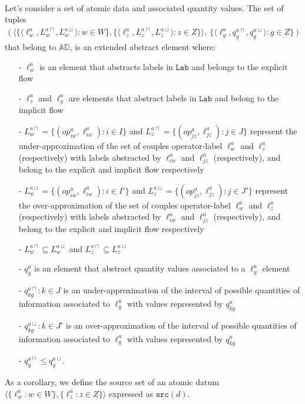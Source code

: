 \documentclass{llncs}
\newcommand{\blangle}{\big\langle}
\newcommand{\brangle}{\big\rangle}
\begin{document}
\begin{definition}\label{ad_abs_ext}
~\\ Let's consider a set of atomic data and associated quantity values. The set of tuples
\begin{align*}
\big (\ \blangle\{\langle \ell^a_w, L_w^{a\sqcap}, L_w^{a\sqcup}\rangle : w \in W\}, \{\langle \ell^a_z, L_z^{a\sqcap}, L_z^{a\sqcup}\rangle : z \in Z\}\brangle,\ \{\langle \ell_g^a, q_g^{a\sqcap}, q_g^{a\sqcup} \rangle: g\in Z \}\ \big )
\end{align*}
that belong to $\mathds{AD}$, is an extended abstract element where:
\begin{itemize}
\item[-] $\ell_w^a$ is an element that abstracts labels in $\texttt{Lab}$ and belongs to the explicit flow
\item[-] $\ell_z^a$ and $\ell_g^a$ are elements that abstract labels in $\texttt{Lab}$ and belong to the implicit flow
\item[-] $L_w^{a\sqcap}= \{(op^a_{iw}, \ell^a_{iw}): i \in I\}$ and $L_z^{a\sqcap}= \{(op^a_{jz}, \ell^a_{jz}): j \in J\}$ represent the under-approximation of the set of couples operator-label  $\ell_w^a $ and $\ell_z^a $ (respectively) with labels abstracted by $\ell_{iw}^a$ and $\ell_{jz}^a$ (respectively), and belong to the explicit and implicit flow respectively
\item[-] $L_w^{a\sqcup}= \{(op^a_{iw}, \ell^a_{iw}): i \in I'\}$ and  $L_z^{a\sqcup}= \{(op^a_{jz}, \ell^a_{jz}): j \in J'\}$ represent the over-approximation of the set of couples operator-label  $\ell_w^a $ and $\ell_z^a $ (respectively) with labels abstracted by $\ell_{iw}^a$ and $\ell_{jz}^a$ (respectively), and belong to the explicit and implicit flow respectively
\item[-] $L_w^{a\sqcap}\subseteq L_w^{a\sqcup}$ and $L_z^{a\sqcap}\subseteq L_z^{a\sqcup}$
\item[-] $q_g^a$ is an element that abstract quantity values associated to a $\ell_g^a$ element
\item[-] $q^{a\sqcap}_{kg}: k \in J$  is an under-approximation of the interval of possible quantities of information associated to $\ell_g^a $ with values represented by $q_{kg}^a$ 
\item[-] $q^{a\sqcup}_{kg}: k \in J'$ is an over-approximation of the interval of possible quantities of information associated to $\ell_g^a $ with values represented by $q_{kg}^a$ 
\item[-] $q_g^{a\sqcap} \leqslant q_g^{a\sqcup}$.
\end{itemize}
\end{definition}
As a corollary, we define the source set of an atomic datum $\langle \{\ell^a_w: w\in W\}, \{\ell^a_z: z\in Z\} \rangle$ expressed as $\mathtt{src}(d)$.
\end{document}
